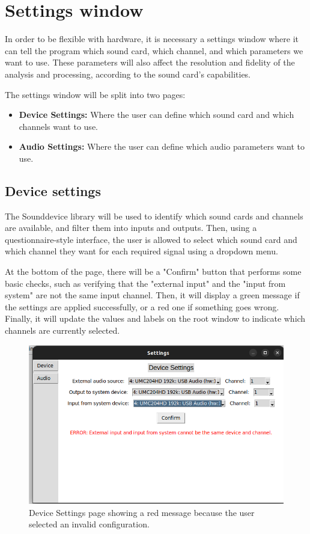 \section{Settings window}

In order to be flexible with hardware, it is necessary a settings window where it can tell the program which sound card, which channel, and which parameters we want to use. These parameters will also affect the resolution and fidelity of the analysis and processing, according to the sound card’s capabilities.

The settings window will be split into two pages:
\begin{itemize}
	\item \textbf{Device Settings:} Where the user can define which sound card and which channels want to use.
	\item \textbf{Audio Settings:} Where the user can define which audio parameters want to use.
\end{itemize}

\subsection{Device settings}

The Sounddevice library will be used to identify which sound cards and channels are available, and filter them into inputs and outputs. Then, using a questionnaire-style interface, the user is allowed to select which sound card and which channel they want for each required signal using a dropdown menu.

At the bottom of the page, there will be a "Confirm" button that performs some basic checks, such as verifying that the "external input" and the "input from system" are not the same input channel. Then, it will display a green message if the settings are applied successfully, or a red one if something goes wrong. Finally, it will update the values and labels on the root window to indicate which channels are currently selected.

\begin{figure}[H]
	\centering
	\includegraphics[width=0.8
	\linewidth]{Figures/DevSet.png}
	\caption[Device setting page]{Device Settings page showing a red message because the user selected an invalid configuration.}
	\label{fig:Device Settings}
\end{figure}

